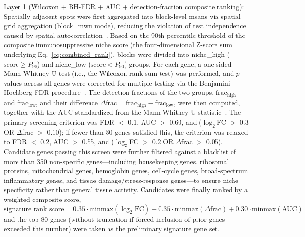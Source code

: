 \documentclass[12pt, a4paper]{article}
\begin{document}
Layer 1 (Wilcoxon + BH-FDR + AUC + detection-fraction composite ranking): Spatially adjacent spots were first aggregated into block-level means via spatial grid aggregation (block\_mwu mode), reducing the violation of test independence caused by spatial autocorrelation~\citep{palla2022squidpy}. Based on the 90th-percentile threshold of the composite immunosuppressive niche score (the four-dimensional Z-score sum underlying Eq.~\ref{eq:combined_rank}), blocks were divided into niche\_high ($\text{score} \geq P_{90}$) and niche\_low ($\text{score} < P_{90}$) groups. For each gene, a one-sided Mann-Whitney U test (i.e., the Wilcoxon rank-sum test) was performed, and $p$-values across all genes were corrected for multiple testing via the Benjamini-Hochberg FDR procedure~\citep{mann1947test}. The detection fractions of the two groups, $\text{frac}_{\text{high}}$ and $\text{frac}_{\text{low}}$, and their difference $\Delta\text{frac} = \text{frac}_{\text{high}} - \text{frac}_{\text{low}}$, were then computed, together with the AUC standardized from the Mann-Whitney U statistic~\citep{hanley1982meaning}. The primary screening criterion was FDR $<$ 0.1, AUC $>$ 0.60, and ($\log_2$FC $>$ 0.3 OR $\Delta$frac $>$ 0.10); if fewer than 80 genes satisfied this, the criterion was relaxed to FDR $<$ 0.2, AUC $>$ 0.55, and ($\log_2$FC $>$ 0.2 OR $\Delta$frac $>$ 0.05). Candidate genes passing this screen were further filtered against a blacklist of more than 350 non-specific genes—including housekeeping genes, ribosomal proteins, mitochondrial genes, hemoglobin genes, cell-cycle genes, broad-spectrum inflammatory genes, and tissue damage/stress-response genes—to ensure niche specificity rather than general tissue activity. Candidates were finally ranked by a weighted composite score,
\begin{equation*}
\text{signature\_rank\_score} = 0.35 \cdot \text{minmax}(\log_2\text{FC}) + 0.35 \cdot \text{minmax}(\Delta\text{frac}) + 0.30 \cdot \text{minmax}(\text{AUC})
\label{eq:signature_rank_score}
\end{equation*}
and the top 80 genes (without truncation if forced inclusion of prior genes exceeded this number) were taken as the preliminary signature gene set.
\end{document}
